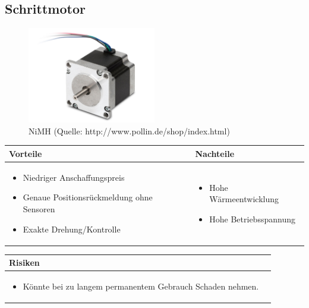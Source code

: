 \pagebreak


\subsection{Schrittmotor}

\begin{figure}[h!]%
\centering
\includegraphics[width=0.5\textwidth]{fig/schrittmotor.JPG}
\caption{NiMH (Quelle: http://www.pollin.de/shop/index.html)}
\label{fig:Java}
\end{figure}

\begin{table}[h]
\begin{tabular}{p{} | p{}}


 \textbf{Vorteile} & \textbf{Nachteile} \\ \hline
	 
\begin{itemize}
\item Niedriger Anschaffungspreis
\item Genaue Positionsrückmeldung ohne Sensoren
\item Exakte Drehung/Kontrolle
\end{itemize}

 
 &
 
\begin{itemize}
\item Hohe Wärmeentwicklung
\item Hohe Betriebsspannung
\end{itemize}

\end{tabular}
\end{table}

\begin{table}[h]
\begin{tabular}{p{}p{}}


 \textbf{Risiken} & \\ \hline
	 
\begin{itemize}
\item Könnte bei zu langem permanentem Gebrauch Schaden nehmen.
\end{itemize}

 
\end{tabular}
\end{table}


